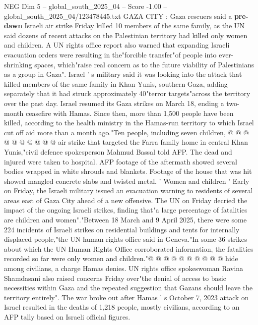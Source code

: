 \begin{textsample}{NEG Dim 5 – global\_south\_2025\_04 – Score -1.00 – global\_south\_2025\_04/123478445.txt}  \label{ex:f5_neg_361}
GAZA CITY : Gaza rescuers said a \textbf{pre-dawn} Israeli air strike Friday killed 10 members of the same family, as the UN said dozens of recent attacks on the Palestinian territory had killed only women and children.
A UN rights office report also warned that expanding Israeli evacuation orders were resulting in the"forcible transfer"of people into ever-shrinking spaces, which"raise real concern as to the future viability of Palestinians as a group in Gaza".
Israel ' s military said it was looking into the attack that killed members of the same family in Khan Yunis, southern Gaza, adding separately that it had struck approximately 40"terror targets"across the territory over the past day.
Israel resumed its Gaza strikes on March 18, ending a two-month ceasefire with Hamas.
Since then, more than 1,500 people have been killed, according to the health ministry in the Hamas-run territory to which Israel cut off aid more than a month ago."Ten people, including seven children, @ @ @ @ @ @ @ @ @ @ air strike that targeted the Farra family home in central Khan Yunis,"civil defence spokesperson Mahmud Bassal told AFP.
The dead and injured were taken to hospital.
AFP footage of the aftermath showed several bodies wrapped in white shrouds and blankets.
Footage of the house that was hit showed mangled concrete slabs and twisted metal. ' Women and children ' Early on Friday, the Israeli military issued an evacuation warning to residents of several areas east of Gaza City ahead of a new offensive.
The UN on Friday decried the impact of the ongoing Israeli strikes, finding that"a large percentage of fatalities are children and women"."Between 18 March and 9 April 2025, there were some 224 incidents of Israeli strikes on residential buildings and tents for internally displaced people,"the UN human rights office said in Geneva."In some 36 strikes about which the UN Human Rights Office corroborated information, the fatalities recorded so far were only women and children."@ @ @ @ @ @ @ @ @ @ hide among civilians, a charge Hamas denies.
UN rights office spokeswoman Ravina Shamdasani also raised concerns Friday over"the denial of access to basic necessities within Gaza and the repeated suggestion that Gazans should leave the territory entirely".
The war broke out after Hamas ' s October 7, 2023 attack on Israel resulted in the deaths of 1,218 people, mostly civilians, according to an AFP tally based on Israeli official figures.

\end{textsample}
